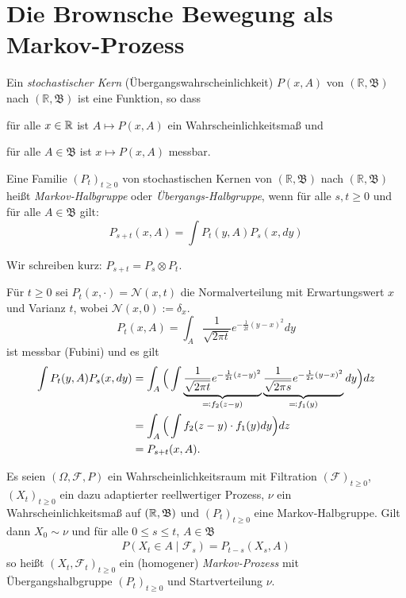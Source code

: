 \documentclass[a4paper,twoside,DIV15,BCOR12mm]{scrbook}
\newcommand{\cF}{\mathcal F}
\newcommand{\borel}{{\mathfrak B}}
\begin{document}
\section{Die Brownsche Bewegung als Markov-Prozess}
\begin{definition}
  Ein \emph{stochastischer Kern} (Übergangswahrscheinlichkeit) $P(x,A)$ von $(\mathbb R, \borel)$ nach $(\mathbb R, \borel)$ ist eine Funktion, so dass
  \begin{enuma}
  \item für alle $x\in \mathbb{R}$ ist $A\mapsto P(x,A)$ ein Wahrscheinlichkeitsmaß und
  \item für alle $A\in\borel$ ist  $x\mapsto P(x,A)$ messbar.
  \end{enuma}
\end{definition}
\begin{definition}
    Eine Familie $(P_t)_{t\geq 0}$ von stochastischen Kernen von $(\mathbb R, \borel)$ nach $(\mathbb R, \borel)$ heißt \emph{Markov-Halbgruppe} oder \emph{Übergangs-Halbgruppe}, wenn für alle $s,t\ge 0$ und für alle $A\in\borel$ gilt:
\[
P_{s+t}(x,A)=\int P_t(y,A)P_s(x,dy)
\]
\end{definition}
\begin{bemerkung}
  Wir schreiben kurz: $P_{s+t}=P_s\otimes P_t$.
\end{bemerkung}
\begin{beispiel}
Für $t\ge 0$ sei $P_t(x,\cdot)=\mathcal N(x,t)$ die Normalverteilung mit Erwartungswert $x$ und Varianz $t$, wobei $\mathcal N(x,0):=\delta_x$.
\[
P_t(x,A) = \int_A \frac1{\sqrt{2\pi t}} e^{-\frac 1{2t}(y-x)^2}dy
\]
ist messbar (Fubini) und es gilt
\begin{align*}
\int P_t(y,A)P_s(x,dy) &= \int_A \Big(\int \underbrace{\frac1{\sqrt{2\pi t}}e^{-\frac1{2t}(z-y)^2}}_{\ad f_2(z-y)} \underbrace{\frac1{\sqrt{2\pi s}} e^{-\frac1{2s} (y-x)^2}}_{\ad f_1(y)} dy \Big) dz \\
&= \int_A\Big(\int f_2(z-y)\cdot f_1(y) dy\Big) dz \\
&= P_{s+t}(x,A).
\end{align*}
\end{beispiel}

\begin{definition}
Es seien $(\Omega, \cF, P)$ ein Wahrscheinlichkeitsraum mit Filtration $(\cF)_{t\ge 0}$, $(X_t)_{t\ge 0}$ ein dazu adaptierter reellwertiger Prozess, $\nu$ ein Wahrscheinlichkeitsmaß auf $(\MdR, \borel)$ und $(P_t)_{t\ge 0}$ eine Markov-Halbgruppe. Gilt dann $X_0\sim \nu$ und für alle $0\le s\le t$, $A\in\borel$
\begin{align*}
P(X_t\in A\mid \cF_s) = P_{t-s}(X_s,A)\tag{$*$}
\end{align*}
so heißt $(X_t,\cF_t)_{t\ge 0}$ ein (homogener) \emph{Markov-Prozess}\label{Markov-Prozess!allgemeiner} mit Übergangshalbgruppe $(P_t)_{t\ge 0}$ und Startverteilung $\nu$.
\end{definition}
\end{document}
